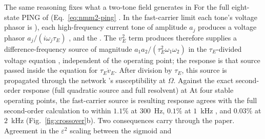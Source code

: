 \documentclass[11pt,a4paper]{article}
\providecommand{\DIFaddtex}[1]{{\protect\color{blue} \sf #1}} %
\providecommand{\DIFdeltex}[1]{{\protect\color{red} \scriptsize #1}} %
\providecommand{\DIFaddbegin}{} %
\providecommand{\DIFaddend}{} %
\providecommand{\DIFdelbegin}{} %
\providecommand{\DIFdelend}{} %
\providecommand{\DIFadd}[1]{\texorpdfstring{\DIFaddtex{#1}}{#1}} %
\providecommand{\DIFdel}[1]{\texorpdfstring{\DIFdeltex{#1}}{}} %
\begin{document}
\DIFdelbegin \DIFdel{The same reasoning fixes what a two-tone field generates in }\DIFdelend \DIFaddbegin \DIFadd{For }\DIFaddend the full eight-state PING \DIFdelbegin \DIFdel{of
}\DIFdelend \DIFaddbegin \DIFadd{(}\DIFaddend Eq.~\eqref{eq:nmm2-ping}\DIFdelbegin \DIFdel{. In the fast-carrier limit each tone's voltage phasor is
}\DIFdelend \DIFaddbegin \DIFadd{), each high-frequency current
tone of amplitude $a_j$ produces a voltage phasor }\DIFaddend $a_j/(i\omega_j\tau_E)$\DIFdelbegin \DIFdel{, and the }\DIFdelend \DIFaddbegin \DIFadd{.
The }\DIFaddend $v_E^2$ term \DIFdelbegin \DIFdel{produces }\DIFdelend \DIFaddbegin \DIFadd{therefore supplies }\DIFaddend a difference-frequency source of magnitude
$a_1a_2/(\tau_E^2\omega_1\omega_2)$ \DIFdelbegin \DIFdel{in the $\tau_E$-divided voltage equation ,
independent of the operating point; the response is that source passed }\DIFdelend \DIFaddbegin \DIFadd{inside the equation for $\tau_E\dot v_E$.
After division by $\tau_E$, this source is propagated }\DIFaddend through the network
\DIFdelbegin \DIFdel{'s }\DIFdelend susceptibility at $\Omega$. \DIFdelbegin \DIFdel{Against the exact second-order response (full
quadratic source and full resolvent) at }\DIFdelend \DIFaddbegin \DIFadd{At }\DIFaddend four stable operating points, the \DIFdelbegin \DIFdel{fast-carrier
source is }\DIFdelend \DIFaddbegin \DIFadd{resulting
response agrees with the full second-order calculation to }\DIFaddend within $1.1\%$ at
$300$~Hz, $0.1\%$ at $1$~kHz\DIFaddbegin \DIFadd{, }\DIFaddend and $0.03\%$ at $2$~kHz
(Fig.~\ref{fig:crossover}b).
\DIFdelbegin \DIFdel{Two consequences carry through the paper. Agreement in the
$\varepsilon^2$ scaling between the sigmoid and }\DIFdelend \DIFaddbegin
\end{document}
